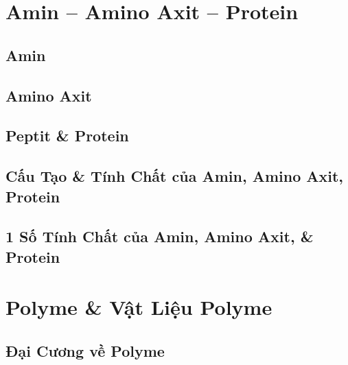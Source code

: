\documentclass{article}
\numberwithin{equation}{section}
\begin{document}

\section{Amin -- Amino Axit -- Protein}

\subsection{Amin}


\subsection{Amino Axit}


\subsection{Peptit \& Protein}


\subsection{Cấu Tạo \& Tính Chất của Amin, Amino Axit, Protein}


\subsection{1 Số Tính Chất của Amin, Amino Axit, \& Protein}


\section{Polyme \& Vật Liệu Polyme}

\subsection{Đại Cương về Polyme}
\end{document}
